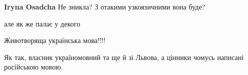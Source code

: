 \begin{itemize}
\begin{itemize}
\textbf{Iryna Osadcha} Не зникла? З отакими узкоязичними вона буде?

\end{itemize}

 
але як же палає у декого \Smiley[1.0][yellow]

 
Животворяща українська мова!!!!

 
Як так, власник україномовний та ще й зі Львова, а цінники чомусь написані російською мовою.

\end{itemize}


